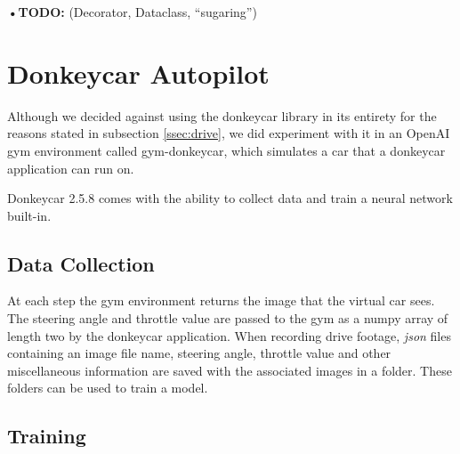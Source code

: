 \documentclass[conference]{IEEEtran}
\begin{document}
\textbf{•TODO:} (Decorator, Dataclass, "`sugaring"')

\section{Donkeycar Autopilot}

Although we decided against using the donkeycar library in its entirety for the reasons stated in subsection \ref{ssec:drive}, we did experiment with it in an OpenAI gym environment called gym-donkeycar, which simulates a car that a donkeycar application can run on.

Donkeycar 2.5.8 comes with the ability to collect data and train a neural network built-in.

\subsection{Data Collection}

At each step the gym environment returns the image that the virtual car sees. 
The steering angle and throttle value are passed to the gym as a numpy array of length two by the donkeycar application. 
When recording drive footage, \textit{json} files containing an image file name, steering angle, throttle value and other miscellaneous information are saved with the associated images in a folder. 
These folders can be used to train a model.

\subsection{Training}
\end{document}
